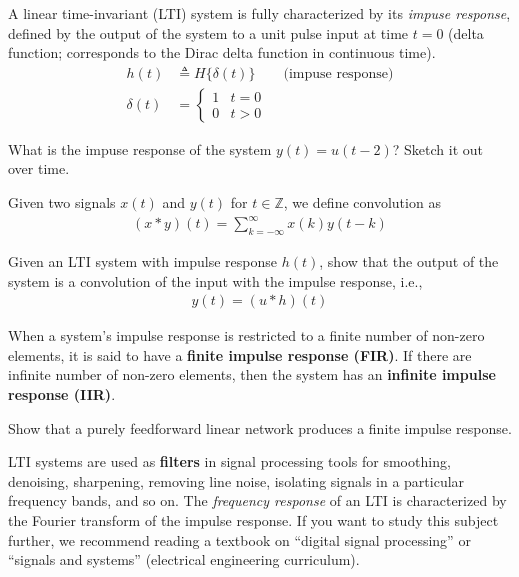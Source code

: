 \documentclass[a4paper,11pt]{exam}
\newcounter{ct}
\newcommand{\field}[1]{\ensuremath{\mathbb{#1}}}
\newcommand{\integers}{\field{Z}}
\begin{document}
\begin{questions}
\begin{tcolorbox}
A linear time-invariant (LTI) system is fully characterized by its \emph{impuse response}, defined by the output of the system to a unit pulse input at time $t = 0$ (delta function; corresponds to the Dirac delta function in continuous time).
\begin{align}
    h(t) &\triangleq H\{ \delta(t) \} \qquad \text{(impuse response)}
    \\
    \delta(t) &= 
	\begin{cases}
	1 & t = 0\\
	0 & t > 0
	\end{cases}
\end{align}
\end{tcolorbox}

\question What is the impuse response of the system $y(t) = u(t-2)$? Sketch it out over time.

\begin{tcolorbox}[colback=black!1!,title=Convolution]
    Given two signals $x(t)$ and $y(t)$ for $t \in \integers$, we define convolution as
\begin{align}\label{eq:convolution}
    (x \ast y)(t) = \sum_{k=-\infty}^\infty x(k) y(t-k)
\end{align}
\end{tcolorbox}

\question Given an LTI system with impulse response $h(t)$, show that the output of the system is a convolution of the input with the impulse response, i.e.,
\begin{align}
    y(t) = (u \ast h)(t)
\end{align}

\clearpage
When a system's impulse response is restricted to a finite number of non-zero elements, it is said to have a \textbf{finite impulse response (FIR)}.
If there are infinite number of non-zero elements, then the system has an \textbf{infinite impulse response (IIR)}.

\question Show that a purely feedforward linear network produces a finite impulse response.

LTI systems are used as \textbf{filters} in signal processing tools for smoothing, denoising, sharpening, removing line noise, isolating signals in a particular frequency bands, and so on.
The \emph{frequency response} of an LTI is characterized by the Fourier transform of the impulse response.
If you want to study this subject further, we recommend reading a textbook on ``digital signal processing'' or ``signals and systems'' (electrical engineering curriculum).


\end{questions}
\end{document}
